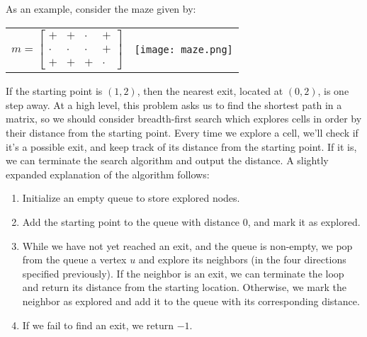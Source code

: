 \documentclass[11pt]{article}
\begin{document}
As an example, consider the maze given by:
\begin{center}
    \begin{tabular}{C{0.3\textwidth}C{0.3\textwidth}}
        $m = \begin{bmatrix}
            + & + & \cdot & + \\
            \cdot & \cdot & \cdot & + \\
            + & + & + & \cdot 
        \end{bmatrix}$ & 
        \texttt{[image: maze.png]}
    \end{tabular}
\end{center}

If the starting point is $(1, 2)$, then the nearest exit, located at $(0, 2)$, is one step away. At a high level, this problem asks us to find the shortest path in a matrix, so we should consider breadth-first search which explores cells in order by their distance from the starting point. Every time we explore a cell, we'll check if it's a possible exit, and keep track of its distance from the starting point. If it is, we can terminate the search algorithm and output the distance. A slightly expanded explanation of the algorithm follows:
\begin{enumerate}
    \item Initialize an empty queue to store explored nodes. 
    \item Add the starting point to the queue with distance 0, and mark it as explored. 
    \item While we have not yet reached an exit, and the queue is non-empty, we pop from the queue a vertex $u$ and explore its neighbors (in the four directions specified previously). If the neighbor is an exit, we can terminate the loop and return its distance from the starting location. Otherwise, we mark the neighbor as explored and add it to the queue with its corresponding distance. 
    \item If we fail to find an exit, we return $-1$. 
\end{enumerate}
\end{document}
